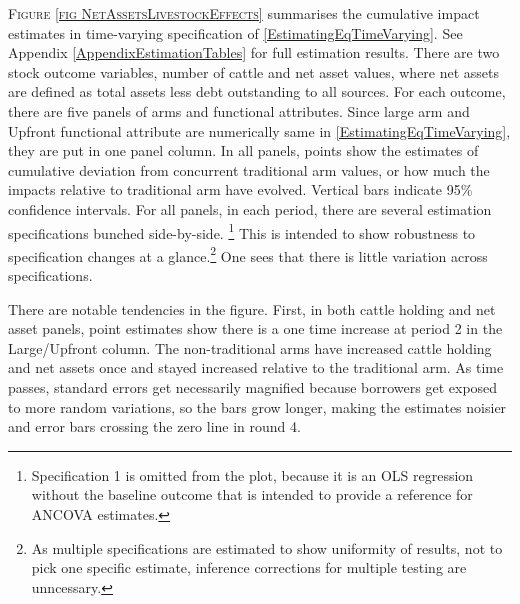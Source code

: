 	\textsc{\footnotesize Figure \ref{fig NetAssetsLivestockEffects}} summarises the cumulative impact estimates in time-varying specification of \eqref{EstimatingEqTimeVarying}.  See Appendix \ref{AppendixEstimationTables} for full estimation results. There are two stock outcome variables,  number of cattle and net asset values, where net assets are defined as total assets less debt outstanding to all sources. For each outcome, there are five panels of arms and functional attributes. Since \textsf{large} arm and \textsf{Upfront} functional attribute are numerically same in \eqref{EstimatingEqTimeVarying}, they are put in one panel column. In all panels, points show the estimates of cumulative deviation from concurrent \textsf{traditional} arm values, or how much the impacts relative to \textsf{traditional} arm have evolved. Vertical bars indicate 95\% confidence intervals. 
	For all panels, in each period, there are several estimation specifications bunched side-by-side. \footnote{Specification 1 is omitted from the plot, because it is an OLS regression without the baseline outcome that is intended to provide a reference for ANCOVA estimates. } This is intended to show robustness to specification changes at a glance.\footnote{As multiple specifications are estimated to show uniformity of results, not to pick one specific estimate, inference corrections for multiple testing are unncessary. } One sees that there is little variation across specifications. %
	
	There are notable tendencies in the figure. First, in both cattle holding and net asset panels, point estimates show there is a one time increase at period 2 in the \textsf{Large/Upfront} column. %
	The non-\textsf{traditional} arms have increased cattle holding and net assets once and stayed increased relative to the \textsf{traditional} arm. As time passes, standard errors get necessarily magnified because borrowers get exposed to more random variations, so the bars grow longer, making the estimates noisier and error bars crossing the zero line in round 4. %

